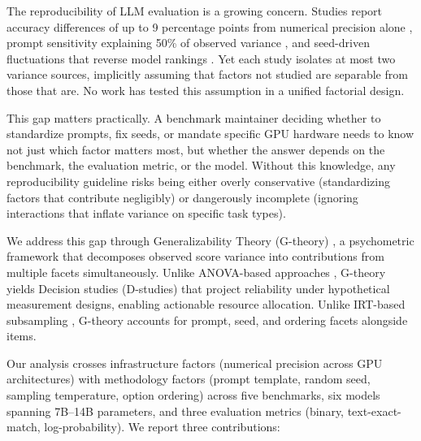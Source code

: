 \documentclass[11pt,twocolumn]{article}
\begin{document}
The reproducibility of LLM evaluation is a growing concern.
Studies report accuracy differences of up to 9 percentage points from numerical precision alone \citep{yuan2025}, prompt sensitivity explaining 50\% of observed variance \citep{brittlebench2026}, and seed-driven fluctuations that reverse model rankings \citep{biderman2024}.
Yet each study isolates at most two variance sources, implicitly assuming that factors not studied are separable from those that are.
No work has tested this assumption in a unified factorial design.

This gap matters practically.
A benchmark maintainer deciding whether to standardize prompts, fix seeds, or mandate specific GPU hardware needs to know not just which factor matters most, but whether the answer depends on the benchmark, the evaluation metric, or the model.
Without this knowledge, any reproducibility guideline risks being either overly conservative (standardizing factors that contribute negligibly) or dangerously incomplete (ignoring interactions that inflate variance on specific task types).

We address this gap through Generalizability Theory (G-theory) \citep{shavelson1991,brennan2001}, a psychometric framework that decomposes observed score variance into contributions from multiple facets simultaneously.
Unlike ANOVA-based approaches \citep{bouthillier2021}, G-theory yields Decision studies (D-studies) that project reliability under hypothetical measurement designs, enabling actionable resource allocation.
Unlike IRT-based subsampling \citep{polo2024,lalor2019}, G-theory accounts for prompt, seed, and ordering facets alongside items.

Our analysis crosses infrastructure factors (numerical precision across GPU architectures) with methodology factors (prompt template, random seed, sampling temperature, option ordering) across five benchmarks, six models spanning 7B--14B parameters, and three evaluation metrics (binary, text-exact-match, log-probability).
We report three contributions:
\end{document}
